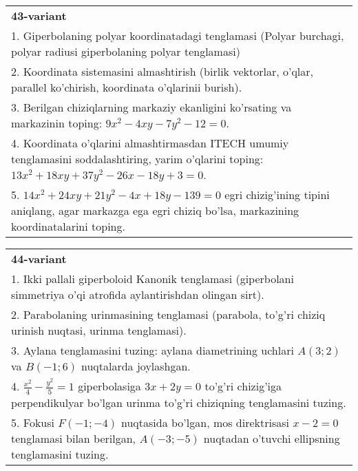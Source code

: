 \documentclass{article}
\begin{document}
\begin{tabular}{m{17cm}}
\textbf{43-variant}\\
1. Giperbolaning polyar koordinatadagi tenglamasi (Polyar burchagi, polyar radiusi giperbolaning polyar tenglamasi)\\

2. Koordinata sistemasini almashtirish (birlik vektorlar, o'qlar, parallel ko'chirish, koordinata o'qlarinii burish).\\

3. Berilgan chiziqlarning markaziy ekanligini ko'rsating va markazinin toping: $9x^{2}-4xy-7y^{2}-12=0$.\\

4. Koordinata o'qlarini almashtirmasdan ITECH umumiy tenglamasini soddalashtiring, yarim o'qlarini toping: $13x^{2} + 18xy + 37y^{2} - 26x - 18y + 3 = 0$.  \\

5. $14x^{2} + 24xy + 21y^{2} - 4x + 18y - 139 = 0$ egri chizig'ining tipini aniqlang, agar markazga ega egri chiziq bo'lsa, markazining koordinatalarini toping.  
\end{tabular}
\vspace{1cm}


\begin{tabular}{m{17cm}}
\textbf{44-variant}\\
1. Ikki pallali giperboloid Kanonik tenglamasi (giperbolani simmetriya o'qi atrofida aylantirishdan olingan sirt).\\

2. Parabolaning urinmasining tenglamasi (parabola, to'g'ri chiziq urinish nuqtasi, urinma tenglamasi).\\

3. Aylana tenglamasini tuzing: aylana diametrining uchlari $A(3;2)$ va $B(-1;6)$ nuqtalarda joylashgan.\\

4. $\frac{x^{2}}{4} - \frac{y^{2}}{5} = 1$ giperbolasiga $3x + 2y = 0$ to'g'ri chizig'iga perpendikulyar bo'lgan urinma to'g'ri chiziqning tenglamasini tuzing.\\

5. Fokusi $F( - 1; - 4)$ nuqtasida bo'lgan, mos direktrisasi $x - 2 = 0$ tenglamasi bilan berilgan, $A( - 3; - 5)$ nuqtadan o'tuvchi ellipsning tenglamasini tuzing.  
\end{tabular}
\vspace{1cm}
\end{document}
